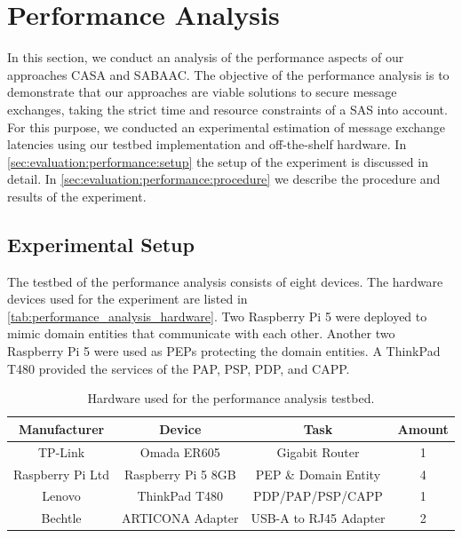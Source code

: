 \section{Performance Analysis}
In this section, we conduct an analysis of the performance aspects of our approaches CASA and SABAAC.
The objective of the performance analysis is to demonstrate that our approaches are viable solutions to secure message exchanges, taking the strict time and resource constraints of a SAS into account.
For this purpose, we conducted an experimental estimation of message exchange latencies using our testbed implementation and off-the-shelf hardware.
In \autoref{sec:evaluation:performance:setup} the setup of the experiment is discussed in detail.
In \autoref{sec:evaluation:performance:procedure} we describe the procedure and results of the experiment.

\subsection{Experimental Setup}
\label{sec:evaluation:performance:setup}
The testbed of the performance analysis consists of eight devices.
The hardware devices used for the experiment are listed in \autoref{tab:performance_analysis_hardware}.
Two Raspberry Pi 5 were deployed to mimic domain entities that communicate with each other.
Another two Raspberry Pi 5 were used as PEPs protecting the domain entities.
A ThinkPad T480 provided the services of the PAP, PSP, PDP, and CAPP.
\begin{table}
    \centering
    \small
    \caption{Hardware used for the performance analysis testbed.}
    \label{tab:performance_analysis_hardware}
    \begin{tabular}{c c c c}
    \toprule
    Manufacturer & Device & Task & Amount\\
    \midrule
    TP-Link & Omada ER605 & Gigabit Router & 1\\
    Raspberry Pi Ltd & Raspberry Pi 5 8GB & PEP \& Domain Entity & 4\\
    Lenovo & ThinkPad T480 & PDP/PAP/PSP/CAPP & 1\\
    Bechtle & ARTICONA Adapter & USB-A to RJ45 Adapter & 2\\
    \bottomrule
    \end{tabular}
\end{table}

